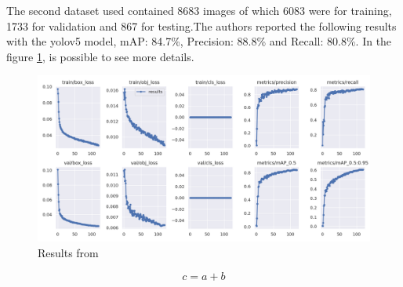 \documentclass[12pt]{article}
\begin{document}
The second dataset\cite{tablice-73he1_dataset} used contained 8683 images of which 6083 were for training, 1733 for validation and 867 for testing.The authors reported the following results with the yolov5 model, mAP: 84.7\%, Precision: 88.8\% and Recall: 80.8\%. In the figure \ref{fig:mesh2}, is possible to see more details.

\begin{figure}[H]
    \centering
    \includegraphics[width=1\linewidth]{results_big_dataset.png}
    \caption{Results from \cite{tablice-73he1_dataset}}
    \label{fig:mesh2}
\end{figure}

\begin{equation}
  \label{moje-rovnice}
  c = a + b
\end{equation}







\begin{flushleft}
  
\end{flushleft}

\end{document}
